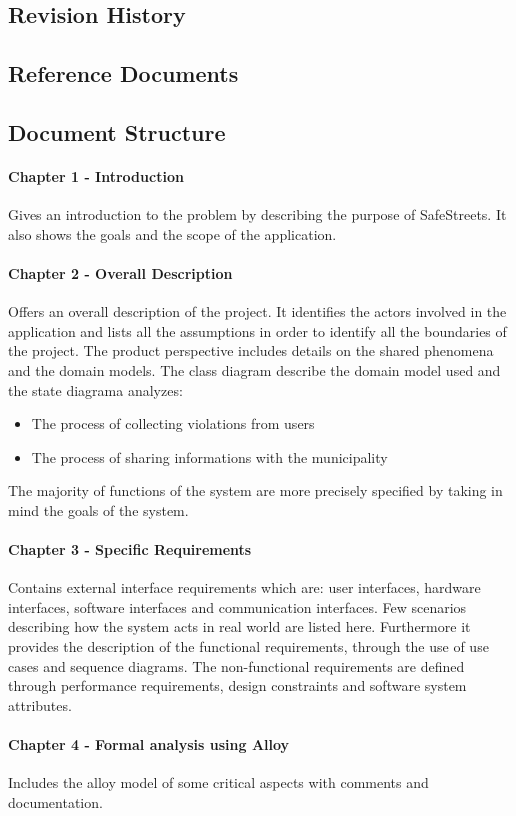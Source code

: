 \documentclass{article}
\begin{document}
\subsection{Revision History}
\subsection{Reference Documents}
\subsection{Document Structure}
\paragraph{Chapter 1 - Introduction}
Gives an introduction to the problem by describing the purpose of SafeStreets.
It also shows the goals and the scope of the application. \paragraph{Chapter 2 -
Overall Description}Offers an overall description of the project. It
identifies the actors involved in the application and lists all the assumptions
in order to identify all the boundaries of the project. The product perspective
includes details on the shared phenomena and the domain models. The class
diagram describe the domain model used and the state diagrama analyzes:
\begin{itemize}
    \item The process of collecting violations from users
    \item The process of sharing informations with the municipality
\end{itemize}
The majority of functions of the system are more precisely specified by taking
in mind the goals of the system.  
\paragraph{Chapter 3 - Specific Requirements}
Contains external interface requirements which are: user interfaces, hardware
interfaces, software interfaces and communication interfaces. Few scenarios
describing how the system acts in real world are listed here. Furthermore it
provides the description of the functional requirements, through the use of use
cases and sequence diagrams. The non-functional requirements are defined through
performance requirements, design constraints and software system attributes.
\paragraph{Chapter 4 - Formal analysis using Alloy}
Includes the alloy model of some critical aspects with comments and
documentation.
\end{document}
